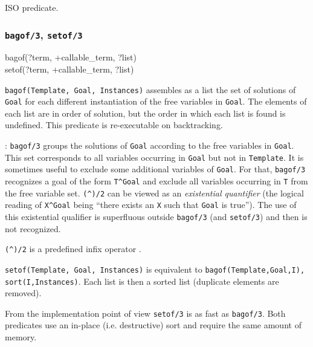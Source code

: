 \Portability

ISO predicate.

\subsubsection{\texttt{bagof/3},
               \texttt{setof/3}}

\begin{TemplatesOneCol}
bagof(?term, +callable\_term, ?list)\\
setof(?term, +callable\_term, ?list)

\end{TemplatesOneCol}

\Description

\texttt{bagof(Template, Goal, Instances)} assembles as a list the
set of solutions of \texttt{Goal} for each different instantiation of the
free variables in \texttt{Goal}. The elements of each list are in order of
solution, but the order in which each list is found is undefined.
This predicate is re-executable on backtracking.

: \texttt{bagof/3} groups the solutions of
\texttt{Goal} according to the free variables in \texttt{Goal}. This set
corresponds to all variables occurring in \texttt{Goal} but not in
\texttt{Template}. It is sometimes useful to exclude some additional
variables of \texttt{Goal}. For that, \texttt{bagof/3} recognizes a goal of
the form \texttt{T\^{}Goal} and exclude all variables occurring in \texttt{T}
from the free variable set. \texttt{(\^{})/2} can be viewed as an
\emph{existential quantifier} (the logical reading of \texttt{X\^{}Goal}
being ``there exists an \texttt{X} such that \texttt{Goal} is true''). The
use of this existential qualifier is superfluous outside \texttt{bagof/3}
(and \texttt{setof/3}) and then is not recognized.

\texttt{(\^{})/2} is a predefined infix operator .

\texttt{setof(Template, Goal, Instances)} is equivalent to
\texttt{bagof(Template,Goal,I), sort(I,Instances)}. Each list is then a
sorted list (duplicate elements are removed).

From the implementation point of view \texttt{setof/3} is as fast as
\texttt{bagof/3}. Both predicates use an in-place (i.e. destructive) sort
 and require the same amount of memory.


